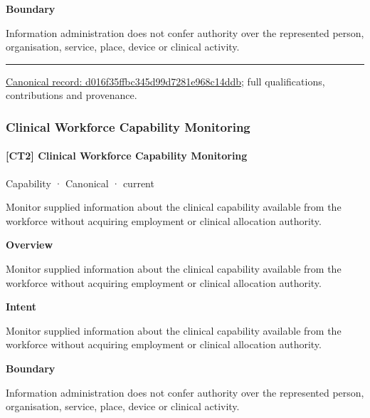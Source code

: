 \textbf{Boundary}



Information administration does not confer authority over the represented person, organisation, service, place, device or clinical activity.



\medskip\hrule\medskip

{\footnotesize \href{../../../../continuum/strategy/capability/d016f35ffbc345d99d7281e968c14ddb.md}{Canonical record: d016f35ffbc345d99d7281e968c14ddb}; full qualifications, contributions and provenance.}\par
\subsubsection{Clinical Workforce Capability Monitoring}

\paragraph{[CT2] Clinical Workforce Capability Monitoring}

\label{element:367b3e5643f44fa785f093db8bb9a6e8}
{\small Capability · Canonical · current}\par

Monitor supplied information about the clinical capability available from the workforce without acquiring employment or clinical allocation authority.



\textbf{Overview}



Monitor supplied information about the clinical capability available from the workforce without acquiring employment or clinical allocation authority.



\textbf{Intent}



Monitor supplied information about the clinical capability available from the workforce without acquiring employment or clinical allocation authority.



\textbf{Boundary}



Information administration does not confer authority over the represented person, organisation, service, place, device or clinical activity.



